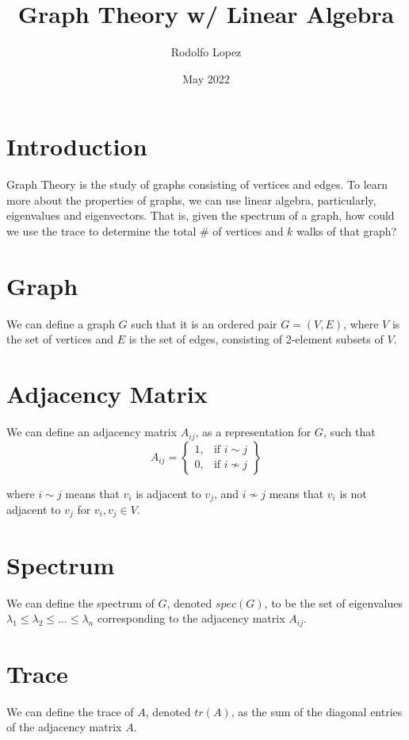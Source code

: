 \documentclass{article}
\title{Graph Theory w/ Linear Algebra}
\author{Rodolfo Lopez }
\date{May 2022}
\begin{document}
\maketitle 

\section{Introduction}
Graph Theory is the study of graphs consisting of vertices and edges. To learn more about the properties of graphs, we can use linear algebra, particularly, eigenvalues and eigenvectors. That is, given the spectrum of a graph, how could we use the trace to determine the total \# of vertices and $k$ walks of that graph? 

\section{Graph}
We can define a graph $G$ such that it is an ordered pair $G = (V,E)$, where $V$ is the set of vertices and $E$ is the set of edges, consisting of 2-element subsets of $V$. 

\section{Adjacency Matrix}
We can define an adjacency matrix $A_{ij}$, as a representation for $G$, such that \\

$$
A_{ij} =
\left\{
    \begin{array}{lr}
        1, & \text{if } i \sim j\\
        0, & \text{if } i \not\sim j
    \end{array}
\right\} 
$$

where $i \sim j$ means that $v_i$ is adjacent to $v_j$, and $i \not\sim j$ means that $v_i$ is not adjacent to $v_j$ for $v_i, v_j \in V$.

\section{Spectrum}
We can define the spectrum of $G$, denoted $spec(G)$, to be the set of eigenvalues $\lambda_1 \leq \lambda_2 \leq \ldots \leq \lambda_n$ corresponding to the adjacency matrix $A_{ij}$. 

\section{Trace}
We can define the trace of $A$, denoted $tr(A)$, as the sum of the diagonal entries of the adjacency matrix $A$. \\
\end{document}
